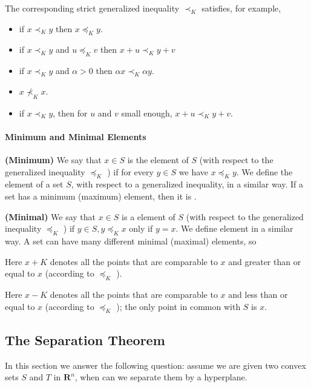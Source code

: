 \documentclass{article}
\newcommand{\bfs}[1]{\textbf{({#1}) }}
\begin{document}
The corresponding strict generalized inequality $\prec_{K}$ satisfies, for example,
\begin{itemize}
    \item if $x \prec_{K} y$ then $x \preceq_{K} y$.
    \item if $x \prec_{K} y$ and $u \preceq_{K} v$ then $x+u \prec_{K} y+v$
    \item if $x \prec_{K} y$ and $\alpha>0$ then $\alpha x \prec_{K} \alpha y$.
    \item $x \nprec_{K} x$.
    \item if $x \prec_{K} y$, then for $u$ and $v$ small enough, $x+u \prec_{K} y+v$.
\end{itemize}
\paragraph{Minimum and Minimal Elements}
\begin{defa}{\bfs{Minimum}}
 We say that $x \in S$ is the  element of $S$ (with respect to the generalized inequality $\preceq_{K}$ ) if for every $y \in S$ we have $x \preceq_{K} y$. We define the  element of a set $S$, with respect to a generalized inequality, in a similar way. If a set has a minimum (maximum) element, then it is .
\end{defa}
\begin{defa}{\bfs{Minimal}}
 We say that $x \in S$ is a  element of $S$ (with respect to the generalized inequality $\preceq_{K}$ ) if $y \in S, y \preceq_{K} x$ only if $y=x$. We define  element in a similar way. A set can have many different minimal (maximal) elements, so 
\end{defa}

Here $x+K$ denotes all the points that are comparable to $x$ and greater than or equal to $x$ (according to $\preceq_{K}$ ). 

Here $x-K$ denotes all the points that are comparable to $x$ and less than or equal to $x$ (according to $\preceq_{K}$ ); the only point in common with $S$ is $x$.

\subsection{The Separation Theorem}
In this section we answer the following question: assume we are given two convex sets $S$ and $T$ in $\mathbf{R}^n$, when can we separate them by a hyperplane.
\end{document}
